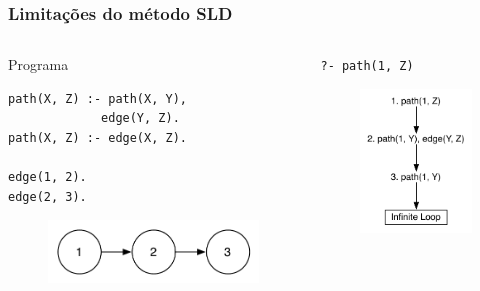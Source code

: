\documentclass{beamer}
\begin{document}
\begin{frame}[fragile]
  \frametitle{Limitações do método SLD}
  \begin{columns}[t]
     \begin{block}{Programa}
       {\small
       \begin{verbatim}
path(X, Z) :- path(X, Y),
             edge(Y, Z).
path(X, Z) :- edge(X, Z).

edge(1, 2).
edge(2, 3).
       \end{verbatim}
       }
       \begin{figure}[ht]
         \centering
           \includegraphics[scale=0.6]{edges.pdf}
       \end{figure}
     \pause
     \end{block}
      \begin{block}{\texttt{?- path(1,~Z)}}
        \begin{figure}[ht]
          \centering
            \includegraphics[scale=0.8]{inf.pdf}
        \end{figure}
      \end{block}
      
  \end{columns}
\end{frame}
\end{document}
